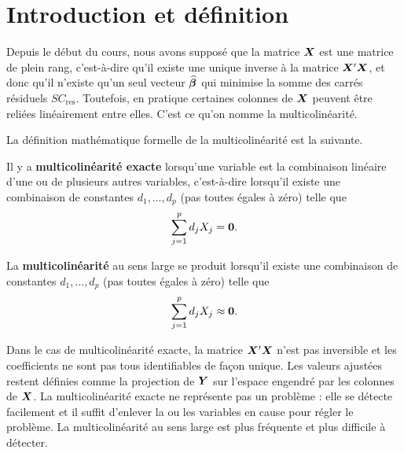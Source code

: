 



\section{Introduction et définition}
Depuis le début du cours, nous avons supposé que la matrice  $\bm{X}$ est une matrice de plein rang, c'est-à-dire qu'il existe une unique inverse à la matrice $\bm{X}'\bm{X}$, et donc qu'il n'existe qu'un seul vecteur $\widehat{\bm\beta}$ qui minimise la somme des carrés résiduels $SC_{\text{res}}$. Toutefois, en pratique certaines colonnes de $\bm{X}$ peuvent être reliées linéairement entre elles. C'est ce qu'on nomme la  multicolinéarité.

La définition mathématique formelle de la multicolinéarité est la suivante.
\begin{defn}\label{def:multi}
Il y a \textbf{multicolinéarité exacte} lorsqu'une variable est la combinaison linéaire d'une ou de plusieurs autres variables, c'est-à-dire  lorsqu'il existe une
 combinaison de constantes $d_1,\ldots,d_p$ (pas toutes \'egales
 \`a z\'ero) telle que
 $$\sum_{j=1}^pd_jX_j=\bm{0}.$$
\end{defn}

\begin{defn}
La \textbf{multicolinéarité} au sens large se produit lorsqu'il existe une
combinaison de constantes $d_1,\ldots,d_p$ (pas toutes \'egales
 \`a z\'ero) telle que
 $$\sum_{j=1}^pd_jX_j\approx \bm{0}.$$
 \end{defn}
Dans le cas de multicolinéarité exacte, la matrice $\bm{X}'\bm{X}$ n'est pas inversible et les coefficients ne sont pas tous identifiables de façon unique. Les valeurs ajustées restent définies comme la projection de $\bm{Y}$ sur l'espace engendré par les colonnes de $\bm{X}$.
La multicolinéarité exacte ne représente pas un problème : elle se détecte facilement et il suffit d'enlever la ou les variables en cause pour régler le problème.
La multicolinéarité au sens large est plus fréquente et plus difficile à détecter.


